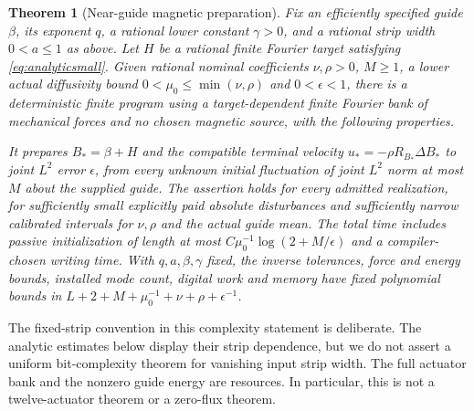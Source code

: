 \documentclass[11pt,a4paper]{amsart}
\newtheorem{theorem}{Theorem}[section]
\theoremstyle{definition}
\theoremstyle{remark}
\numberwithin{equation}{section}
\begin{document}
\begin{theorem}[Near-guide magnetic preparation]\label{thm:guide}
Fix an efficiently specified guide $\beta$, its exponent $q$, a rational lower constant $\gamma>0$, and a rational strip width $0<a\le1$ as above. Let $H$ be a rational finite Fourier target satisfying \eqref{eq:analyticsmall}. Given rational nominal coefficients $\nu,\rho>0$, $M\ge1$, a lower actual diffusivity bound $0<\mu_0\le\min(\nu,\rho)$ and $0<\epsilon<1$, there is a deterministic finite program using a target-dependent finite Fourier bank of mechanical forces and no chosen magnetic source, with the following properties.

It prepares $B_*=\beta+H$ and the compatible terminal velocity $u_*=-\rho R_{B_*}\Delta B_*$ to joint $L^2$ error $\epsilon$, from every unknown initial fluctuation of joint $L^2$ norm at most $M$ about the supplied guide. The assertion holds for every admitted realization, for sufficiently small explicitly paid absolute disturbances and sufficiently narrow calibrated intervals for $\nu,\rho$ and the actual guide mean. The total time includes passive initialization of length at most
$C\mu_0^{-1}\log(2+M/\epsilon)$ and a compiler-chosen writing time. With $q,a,\beta,\gamma$ fixed, the inverse tolerances, force and energy bounds, installed mode count, digital work and memory have fixed polynomial bounds in $L+2+M+\mu_0^{-1}+\nu+\rho+\epsilon^{-1}$.
\end{theorem}

The fixed-strip convention in this complexity statement is deliberate. The analytic estimates below display their strip dependence, but we do not assert a uniform bit-complexity theorem for vanishing input strip width. The full actuator bank and the nonzero guide energy are resources. In particular, this is not a twelve-actuator theorem or a zero-flux theorem.
\end{document}
